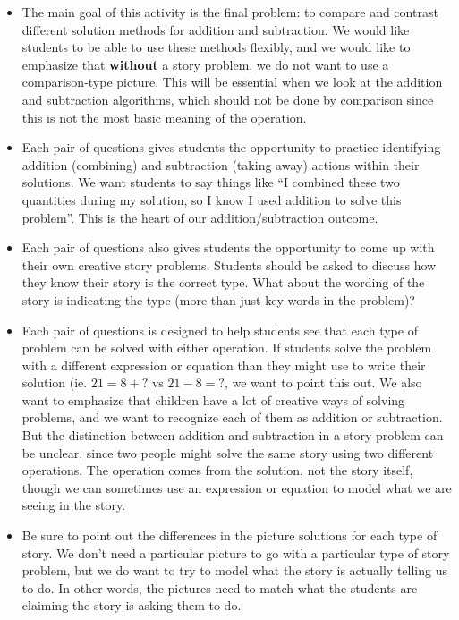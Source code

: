 \documentclass[nooutcomes,noauthor,handout]{ximera}
\begin{document}
\begin{instructorNotes}
\begin{itemize}
	\item The main goal of this activity is the final problem: to compare and contrast different solution methods for addition and subtraction. We would like students to be able to use these methods flexibly, and we would like to emphasize that {\bf without} a story problem, we do not want to use a comparison-type picture. This will be essential when we look at the addition and subtraction algorithms, which should not be done by comparison since this is not the most basic meaning of the operation. 
	\item Each pair of questions gives students the opportunity to practice identifying addition (combining) and subtraction (taking away) actions within their solutions. We want students to say things like ``I combined these two quantities during my solution, so I know I used addition to solve this problem''. This is the heart of our addition/subtraction outcome.
	\item Each pair of questions also gives students the opportunity to come up with their own creative story problems. Students should be asked to discuss how they know their story is the correct type. What about the wording of the story is indicating the type (more than just key words in the problem)?
	\item Each pair of questions is designed to help students see that each type of problem can be solved with either operation. If students solve the problem with a different expression or equation than they might use to write their solution (ie. $21 = 8 + ?$ vs $21-8 = ?$, we want to point this out. We also want to emphasize that children have a lot of creative ways of solving problems, and we want to recognize each of them as addition or subtraction. But the distinction between addition and subtraction in a story problem can be unclear, since two people might solve the same story using two different operations. The operation comes from the solution, not the story itself, though we can sometimes use an expression or equation to model what we are seeing in the story.
	\item Be sure to point out the differences in the picture solutions for each type of story. We don't need a particular picture to go with a particular type of story problem, but we do want to try to model what the story is actually telling us to do. In other words, the pictures need to match what the students are claiming the story is asking them to do.
\end{itemize}


\end{instructorNotes}
\end{document}
